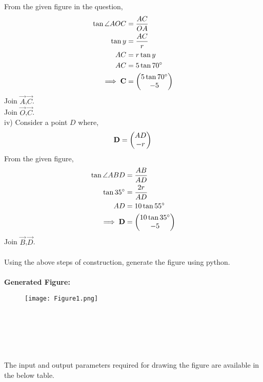 \documentclass[journal,12pt,twocolumn]{IEEEtran}
\begin{document}
From the given figure in the question,
\begin{align}
\tan \angle AOC&=\frac{AC}{OA}\\
\tan y&=\frac{AC}{r}\\
AC&=r\tan y\\
AC&=5\tan 70^\circ\\
\implies \mathbf C&=\begin{pmatrix}5\tan 70^\circ\\-5\end{pmatrix}
\end{align}
Join $\vec A$,$\vec C$.\\
Join $\vec O$,$\vec C$.\\
iv) 
Consider a point $D$ where,\\
\begin{equation}
\mathbf D=\begin{pmatrix}AD\\-r\end{pmatrix}\\
\end{equation}
From the given figure,
\begin{align}
\tan \angle ABD&=\frac{AB}{AD}\\
\tan 35^\circ&=\frac{2r}{AD}\\
AD&=10\tan 55^\circ \\
\implies \mathbf D &=\begin{pmatrix}10\tan35^\circ\\-5\end{pmatrix}
\end{align}
Join $\vec B$,$\vec D$.\\\\
Using the above steps of construction, generate the figure using python.\\\\
\textbf{Generated Figure:}
\begin{figure}[h]
    \centering
    \texttt{[image: Figure1.png]}
\end{figure}
\\\\\\\\\\
The input and output parameters required for drawing the figure are available in the below table.\\
\end{document}
